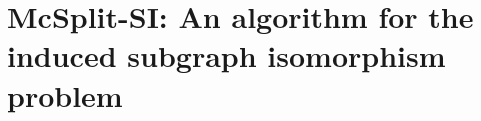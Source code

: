 
\newcommand{\varStartG}{\ensuremath{\AlgVar{start}_G}}
\newcommand{\varEndG}{\ensuremath{\AlgVar{end}_G}}
\newcommand{\varStartH}{\ensuremath{\AlgVar{start}_H}}
\newcommand{\varEndH}{\ensuremath{\AlgVar{end}_H}}
\newcommand{\varActive}{\ensuremath{\AlgVar{active}}}
\newcommand{\varSplitting}{\ensuremath{\AlgVar{splitting}}}
\newcommand{\varPrev}{\ensuremath{\AlgVar{prev}}}
\newcommand{\varNext}{\ensuremath{\AlgVar{next}}}
\newcommand{\labelClass}{\ensuremath{\AlgVar{labelClass}}}
\newcommand{\vertexPtr}{\ensuremath{\AlgVar{vertexPtr}}}
\newcommand{\calLC}{\ensuremath{\mathcal{LC}}}
\newcommand{\LC}{\ensuremath{\AlgVar{LC}}}
\newcommand{\Gptrs}{\ensuremath{\AlgVar{Gptrs}}}
\newcommand{\Hptrs}{\ensuremath{\AlgVar{Hptrs}}}
\newcommand{\Garray}{\ensuremath{A_G}}
\newcommand{\Harray}{\ensuremath{A_H}}

\chapter{McSplit-SI: An algorithm for the induced subgraph isomorphism problem}
\label{c:mcsplit-si}

